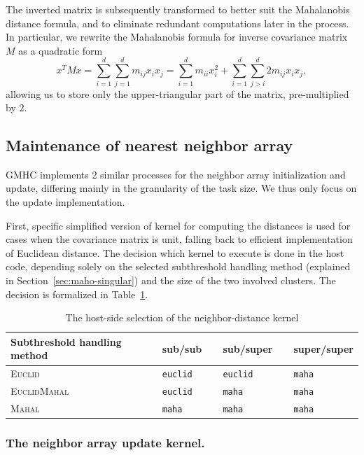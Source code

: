 The inverted matrix is subsequently transformed to better suit the Mahalanobis distance formula, and to eliminate redundant computations later in the process. In particular, we rewrite the Mahalanobis formula for inverse covariance matrix $M$ as a quadratic form
\[x^T M x =
  \sum_{i=1}^{d}\sum_{j=1}^{d}m_{ij}x_ix_j = \sum_{i=1}^{d}m_{ii}x_i^2 + \sum_{i=1}^{d}\sum_{j>i}^{d}2m_{ij}x_ix_j,\]
allowing us to store only the upper-triangular part of the matrix, pre-multiplied by $2$.

\subsection{Maintenance of nearest neighbor array}

GMHC implements 2 similar processes for the neighbor array initialization and update, differing mainly in the granularity of the task size.
We thus only focus on the update implementation.

First, specific simplified version of kernel for computing the distances is used for cases when the covariance matrix is unit, falling back to efficient implementation of Euclidean distance.
The decision which kernel to execute is done in the host code, depending solely on the selected subthreshold handling method (explained in Section~\ref{sec:maho-singular}) and the size of the two involved clusters.
The decision is formalized in Table~\ref{tab:neigh-select}.

\begin{table}[b]
	\centering
	\begin{tabular}{@{}llll@{}}
		\toprule
		Subthreshold handling method~~ & sub/sub~~ & sub/super~~ & super/super \\
		\midrule
		\textsc{Euclid}      & \texttt{euclid} & \texttt{euclid} & \texttt{maha}  \\
		\textsc{EuclidMahal} & \texttt{euclid} & \texttt{maha}   & \texttt{maha}  \\
		\textsc{Mahal}       & \texttt{maha}   & \texttt{maha}   & \texttt{maha}  \\
		\bottomrule
	\end{tabular}
  \smallskip
	\caption{The host-side selection of the neighbor-distance kernel}
	\label{tab:neigh-select}
\end{table}


\subsubsection{The neighbor array update kernel.}

